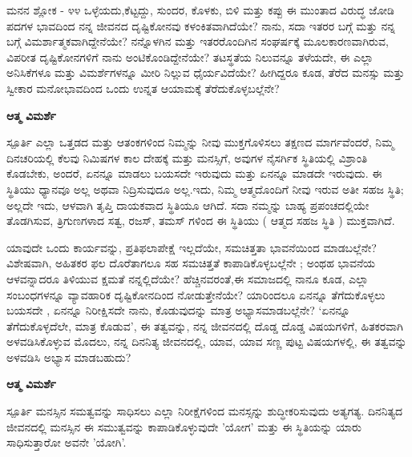 \begin{mananam}{\mananamfont ಮನನ ಶ್ಲೋಕ - ೪೪}
\footnotesize \mananamtext ಒಳ್ಳೆಯದು,ಕೆಟ್ಟದ್ದು, ಸುಂದರ, ಕೊಳಕು, ಬಿಳಿ ಮತ್ತು ಕಪ್ಪು ಈ ಮುಂತಾದ ವಿರುದ್ಧ ಜೋಡಿ ಪದಗಳ ಭಾವದಿಂದ ನನ್ನ ಜೀವನದ ದೃಷ್ಟಿಕೋನವು ಕಳಂಕಿತವಾಗಿದೆಯೇ? ನಾನು, ಸದಾ ಇತರರ ಬಗ್ಗೆ ಮತ್ತು ನನ್ನ ಬಗ್ಗೆ ವಿಮರ್ಶಾತ್ಮಕವಾಗಿದ್ದೇನೆಯೇ? ನನ್ನೊಳಗಿನ ಮತ್ತು ಇತರರೊಂದಿಗಿನ  ಸಂಘರ್ಷಕ್ಕೆ ಮೂಲಕಾರಣವಾಗಿರುವ, ವಿಪರೀತ ದೃಷ್ಟಿಕೋನಗಳಿಗೆ ನಾನು ಅಂಟಿಕೊಂಡಿದ್ದೇನೆಯೇ? ತಟಸ್ಥತೆಯ ನಿಲುವನ್ನೂ ತಳೆಯದೇ, ಈ ಎಲ್ಲಾ ಅನಿಸಿಕೆಗಳೂ ಮತ್ತು ವಿಮರ್ಶೆಗಳನ್ನೂ ಮೀರಿ ನಿಲ್ಲುವ ಧೈರ್ಯವಿದೆಯೇ? ಹೀಗಿದ್ದರೂ ಕೂಡ,  ತೆರೆದ ಮನಸ್ಸು ಮತ್ತು ಸ್ವೀಕಾರ ಮನೋಭಾವದಿಂದ ಒಂದು ಉನ್ನತ ಆಯಾಮಕ್ಕೆ ತೆರೆದುಕೊಳ್ಳಬಲ್ಲೆನೇ?
\end{mananam}
\WritingHand\enspace\textbf{ಆತ್ಮ ವಿಮರ್ಶೆ}
\begin{inspiration}{\mananamfont ಸ್ಪೂರ್ತಿ}
\footnotesize \mananamtext ಎಲ್ಲಾ ಒತ್ತಡದ ಮತ್ತು ಆತಂಕಗಳಿಂದ ನಿಮ್ಮನ್ನು ನೀವು ಮುಕ್ತಗೊಳಿಸಲು ತಕ್ಷಣದ ಮಾರ್ಗವೆಂದರೆ, ನಿಮ್ಮ ದಿನಚರಿಯಲ್ಲಿ ಕೆಲವು ನಿಮಿಷಗಳ ಕಾಲ ದೇಹಕ್ಕೆ ಮತ್ತು ಮನಸ್ಸಿಗೆ, ಅವುಗಳ ನೈಸರ್ಗಿಕ ಸ್ಥಿತಿಯಲ್ಲಿ ವಿಶ್ರಾಂತಿ ಕೊಡಬೇಕು,  ಅಂದರೆ,  ಏನನ್ನೂ ಮಾಡಲು ಬಯಸದೇ ಇರುವುದು ಮತ್ತು ಏನನ್ನೂ ಮಾಡದೇ ಇರುವುದು. ಈ ಸ್ಥಿತಿಯು ಧ್ಯಾನವೂ ಅಲ್ಲ ಅಥವಾ ನಿದ್ರಿಸುವುದೂ ಅಲ್ಲ.ಇದು, ನಿಮ್ಮ ಆತ್ಮದೊಂದಿಗೆ ನೀವು ಇರುವ ಅತೀ ಸಹಜ ಸ್ಥಿತಿ;   ಅಲ್ಲದೇ ಇದು, ಆಳವಾಗಿ ತೃಪ್ತಿ ದಾಯಕವಾದ ಸ್ಥಿತಿಯೂ ಆಗಿದೆ. ಸದಾ ನಮ್ಮನ್ನು ಬಾಹ್ಯ ಪ್ರಪಂಚದಲ್ಲಿಯೇ ತೊಡಗಿಸುವ, ತ್ರಿಗುಣಗಳಾದ ಸತ್ವ, ರಜಸ್, ತಮಸ್ ಗಳಿಂದ ಈ ಸ್ಥಿತಿಯು ( ಆತ್ಮದ ಸಹಜ ಸ್ಥಿತಿ ) ಮುಕ್ತವಾಗಿದೆ. 
\end{inspiration}
\newpage

\newpage
\begin{mananam}{}
\footnotesize \mananamtext ಯಾವುದೇ ಒಂದು ಕಾರ್ಯವನ್ನು, ಪ್ರತಿಫಲಾಪೇಕ್ಷೆ ಇಲ್ಲದೆಯೇ, ಸಮಚಿತ್ತತಾ ಭಾವನೆಯಿಂದ  ಮಾಡಬಲ್ಲೆನೇ? ವಿಶೇಷವಾಗಿ,  ಅಹಿತಕರ ಫಲ ದೊರೆತಾಗಲೂ ಸಹ ಸಮಚಿತ್ತತೆ ಕಾಪಾಡಿಕೊಳ್ಳಬಲ್ಲೆನೇ ; ಅಂಥಹ ಭಾವನೆಯ ಆಳವನ್ನಾದರೂ ತಿಳಿಯುವ ಕ್ಷಮತೆ ನನ್ನಲ್ಲಿದೆಯೇ? ಹೆಚ್ಚಿನವರಂತೆ,ಈ ಸಮಾಜದಲ್ಲಿ ನಾನೂ ಕೂಡ, ಎಲ್ಲಾ ಸಂಬಂಧಗಳನ್ನೂ ವ್ಯಾವಹಾರಿಕ ದೃಷ್ಟಿಕೋನದಿಂದ ನೋಡುತ್ತೇನೆಯೇ? ಯಾರಿಂದಲೂ ಏನನ್ನೂ ತೆಗೆದುಕೊಳ್ಳಲು ಬಯಸದೇ , ಏನನ್ನೂ ನಿರೀಕ್ಷಿಸದೇ ನಾನು,  ಕೊಡುವುದನ್ನು ಮಾತ್ರ ಅಭ್ಯಾಸಮಾಡಬಲ್ಲೆನೇ? ‘ಏನನ್ನೂ ತೆಗೆದುಕೊಳ್ಳದೆಲೇ, ಮಾತ್ರ ಕೊಡುವ’,  ಈ ತತ್ವವನ್ನು, ನನ್ನ ಜೀವನದಲ್ಲಿ ದೊಡ್ಡ ದೊಡ್ಡ ವಿಷಯಗಳಿಗೆ, ಹಿತಕರವಾಗಿ ಅಳವಡಿಸಿಕೊಳ್ಳುವ  ಮೊದಲು, ನನ್ನ ದಿನನಿತ್ಯ ಜೀವನದಲ್ಲಿ, ಯಾವ, ಯಾವ ಸಣ್ಣ ಪುಟ್ಟ ವಿಷಯಗಳಲ್ಲಿ, ಈ ತತ್ವವನ್ನು ಅಳವಡಿಸಿ ಅಭ್ಯಾಸ ಮಾಡಬಹುದು? 
\end{mananam}
\WritingHand\enspace\textbf{ಆತ್ಮ ವಿಮರ್ಶೆ}
\begin{inspiration}{\mananamfont ಸ್ಪೂರ್ತಿ}
\footnotesize \mananamtext ಮನಸ್ಸಿನ ಸಮತ್ವವನ್ನು ಸಾಧಿಸಲು ಎಲ್ಲಾ ನಿರೀಕ್ಷೆಗಳಿಂದ ಮನಸ್ಸನ್ನು ಶುದ್ಧೀಕರಿಸುವುದು ಅತ್ಯಗತ್ಯ. ದಿನನಿತ್ಯದ ಜೀವನದಲ್ಲಿ ಮನಸ್ಸಿನ ಈ ಸಮುತ್ವವನ್ನು ಕಾಪಾಡಿಕೊಳ್ಳುವುದೇ 'ಯೋಗ' ಮತ್ತು ಈ ಸ್ಥಿತಿಯನ್ನು ಯಾರು ಸಾಧಿಸುತ್ತಾರೋ ಅವನೇ 'ಯೋಗಿ'.
\end{inspiration}
\newpage

